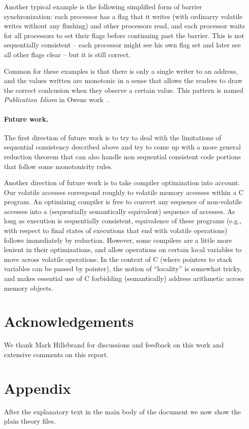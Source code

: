 \documentclass[11pt]{llncs}
\newcommand{\eg}{e.g.,\xspace}
\begin{document}
Another typical example is the following simplified form of
barrier synchronization: each processor has a flag that it writes (with ordinarry volatile writes without any flushing)
and other processors read, and each processor waits for all processors to
set their flags before continuing past the barrier. This is not
sequentially consistent -- each processor might see his own flag set
and later see all other flags clear -- but it is still correct.

Common for these examples is that there is only a single writer to an address,
and the values written are monotonic in a sense that allows the readers to draw the correct conlcusion
when they observe a certain value. This pattern is named
\emph{Publication Idiom} in Owens work~\cite{Owens-draft}.




\paragraph{Future work.}
The first direction of future work is to try to deal with the limitations
of sequential consistency described above and try to come up with a more general reduction
theorem that can also handle non sequential consistent code portions that follow some
monotonicity rules.

Another direction of future work is to take compiler optimization into
account. Our volatile accesses correspond roughly to volatile memory
accesses within a C program. An optimizing compiler is free to convert
any sequence of non-volatile accesses into a (sequentially
semantically equivalent) sequence of accesses. As long as execution is
sequentially consistent, equivalence of these programs (\eg with
respect to final states of executions that end with volatile
operations) follows immediately by reduction. However, some compilers
are a little more lenient in their optimizations, and allow operations
on certain local variables to move across volatile operations. In the
context of C (where pointers to stack variables can be passed by
pointer), the notion of ``locality'' is somewhat tricky, and makes
essential use of C forbidding (semantically) address arithmetic across
memory objects.

\section*{Acknowledgements}
We thank Mark Hillebrand for discussions and feedback on this work and
extensive comments on this report.

\appendix
\section{Appendix}
After the explanatory text in the main body of the document we now show the plain theory files.








%
\end{document}
